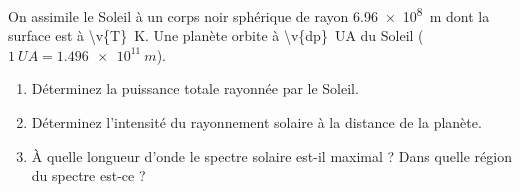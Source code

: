 On assimile le Soleil à un corps noir sphérique de rayon \qty{6.96e8}{m} dont la surface est à \qty{\v{T}}{K}. Une planète orbite à \qty{\v{dp}}{UA} du Soleil ($\qty{1}{UA} = \qty{1.496e11}{m}$).

\begin{enumerate}[label=\alph*)]
    \item Déterminez la puissance totale rayonnée par le Soleil.
    \item Déterminez l'intensité du rayonnement solaire à la distance de la planète.
    \item À quelle longueur d'onde le spectre solaire est-il maximal ? Dans quelle région du spectre est-ce ?
\end{enumerate}
